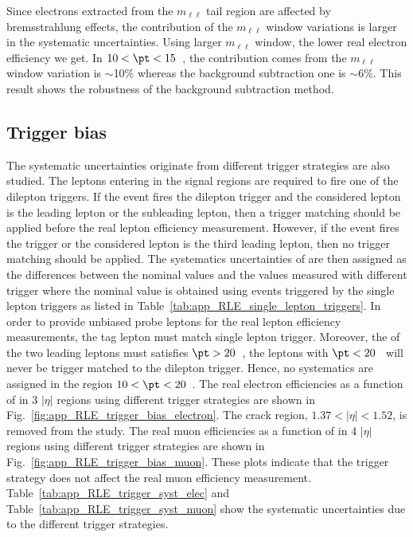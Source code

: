 Since electrons extracted from the $m_{\ell \ell}$ tail region are affected by bremsstrahlung effects, the contribution of the $m_{\ell \ell}$ window variations is larger in the systematic uncertainties.
Using larger $m_{\ell \ell}$ window, the lower real electron efficiency we get.
In $10 < \pt < 15$~{\GeV}, the contribution comes from the $m_{\ell\ell}$ window variation is $\sim$10\% whereas the background subtraction one is $\sim$6\%.
This result shows the robustness of the background subtraction method.


\subsection{Trigger bias}
\label{subsec:app_RLE_trigger_bias}
The systematic uncertainties originate from different trigger strategies are also studied.
The leptons entering in the signal regions are required to fire one of the dilepton triggers.
If the event fires the dilepton trigger and the considered lepton is the leading lepton or the subleading lepton, then a trigger matching should be applied before the real lepton efficiency measurement.
However, if the event fires the \met trigger or the considered lepton is the third leading lepton, then no trigger matching should be applied.
The systematics uncertainties of are then assigned as the differences between the nominal values and the values measured with different trigger where the nominal value is obtained using events triggered by the single lepton triggers as listed in Table~\ref{tab:app_RLE_single_lepton_triggers}.
In order to provide unbiased probe leptons for the real lepton efficiency measurements, the tag lepton must match single lepton trigger.
Moreover, the \pt of the two leading leptons must satisfies $\pt > 20$~{\GeV}, the leptons with $\pt < 20$~{\GeV} will never be trigger matched to the dilepton trigger.
Hence, no systematics are assigned in the region $10 < \pt < 20$~{\GeV}.
The real electron efficiencies as a function of \pt in 3 $|\eta|$ regions using different trigger strategies are shown in Fig.~\ref{fig:app_RLE_trigger_bias_electron}.
The crack region, $1.37<|\eta|<1.52$, is removed from the study.
The real muon efficiencies as a function of \pt in 4 $|\eta|$ regions using different trigger strategies are shown in Fig.~\ref{fig:app_RLE_trigger_bias_muon}.
These plots indicate that the trigger strategy does not affect the real muon efficiency measurement.
Table~\ref{tab:app_RLE_trigger_syst_elec} and Table~\ref{tab:app_RLE_trigger_syst_muon} show the systematic uncertainties due to the different trigger strategies.

